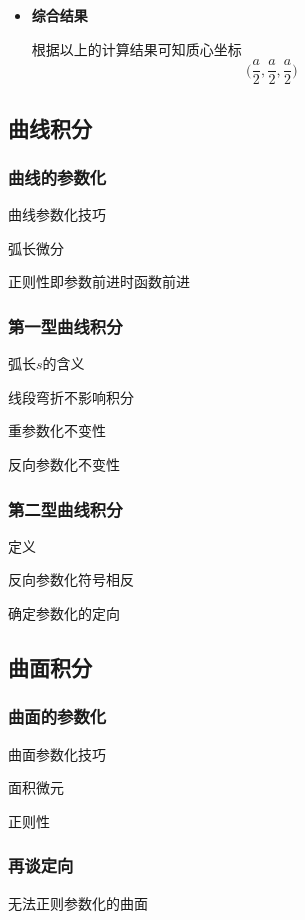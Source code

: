 \documentclass[a4paper,UTF8,fontset=windows,AutoFakeBold]{ctexart}
\newcommand*{\dr}{\hspace{0.07em}\mathrm{d}}
\theoremstyle{ex}
\begin{document}
\begin{enumerate}
{\begin{itemize}
            由于区域描述已经符合累次积分的要求，可以直接写出累次积分
            $$\rho a^3\int_0^{\pi/2}\dr u\int_0^{\pi/2}\sin v\cos v\dr v$$
            换元$t=\sin v$即得其为
            $$\rho a^3\int_0^{\pi/2}\dr u\int_0^1t\dr t=\frac{1}{2}\rho a^3\int_0^{\pi/2}\dr u=\frac{\pi}{4}\rho a^3$$

            \item \textbf{综合结果}
            
            根据以上的计算结果可知质心坐标
            $$\bigg(\frac{a}{2},\frac{a}{2},\frac{a}{2}\bigg)$$
        \end{itemize}
    }
\end{enumerate}

\subsection{曲线积分}
\subsubsection{曲线的参数化}
曲线参数化技巧

弧长微分

正则性即参数前进时函数前进

\subsubsection{第一型曲线积分}
弧长$s$的含义

线段弯折不影响积分

重参数化不变性

反向参数化不变性

\subsubsection{第二型曲线积分}
定义

反向参数化符号相反

确定参数化的定向

\subsection{曲面积分}
\subsubsection{曲面的参数化}
曲面参数化技巧

面积微元

正则性

\subsubsection{再谈定向}
无法正则参数化的曲面
\end{document}
